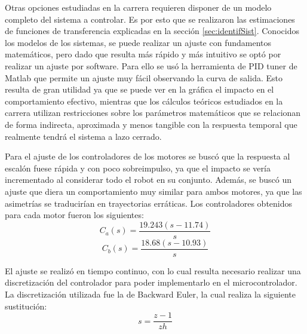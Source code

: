 \documentclass[10pt,conference,a4paper,onecolumn]{article}%
\begin{document}
Otras opciones estudiadas en la carrera requieren disponer de un modelo completo del sistema a controlar. Es por esto que se realizaron las estimaciones de funciones de transferencia explicadas en la sección \ref{sec:identifSist}. Conocidos los modelos de los sistemas, se puede realizar un ajuste con fundamentos matemáticos, pero dado que resulta más rápido y más intuitivo se optó por realizar un ajuste por software. Para ello se usó la herramienta de PID tuner de Matlab \cite{PID_tuner} que permite un ajuste muy fácil observando la curva de salida. Esto resulta de gran utilidad ya que se puede ver en la gráfica el impacto en el comportamiento efectivo, mientras que los cálculos teóricos estudiados en la carrera utilizan restricciones sobre los parámetros matemáticos que se relacionan de forma indirecta, aproximada y menos tangible con la respuesta temporal que realmente tendrá el sistema a lazo cerrado.

Para el ajuste de los controladores de los motores se buscó que la respuesta al escalón fuese rápida y con poco sobreimpulso, ya que el impacto se vería incrementado al considerar todo el robot en su conjunto. Además, se buscó un ajuste que diera un comportamiento muy similar para ambos motores, ya que las asimetrías se traducirían en trayectorias erráticas. Los controladores obtenidos para cada motor fueron los siguientes:
\begin{equation*}
C_a(s)= \frac{  19.243 (s-11.74)}{s}
\end{equation*}
\begin{equation*}
C_b(s)= \frac{ 18.68 (s-10.93)}{s}
\end{equation*}

El ajuste se realizó en tiempo continuo, con lo cual resulta necesario realizar una discretización del controlador para poder implementarlo en el microcontrolador. La discretización utilizada fue la de Backward Euler, la cual realiza la siguiente sustitución:
\begin{equation*}
s=\frac{z-1}{zh}
\end{equation*}%
\end{document}
